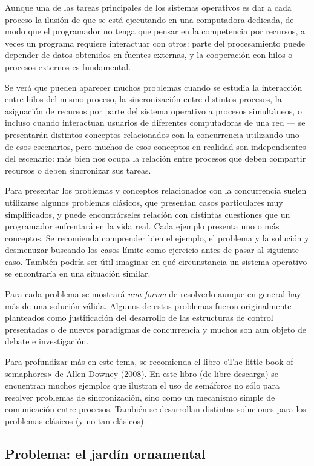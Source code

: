 \documentclass[11pt,fleqn]{book} %
\begin{document}
Aunque una de las tareas principales de los sistemas operativos es dar
a cada proceso la ilusión de que se está ejecutando en una computadora
dedicada, de modo que el programador no tenga que pensar en la
competencia por recursos, a veces un programa requiere interactuar con
otros: parte del procesamiento puede depender de datos
obtenidos en fuentes externas, y la cooperación con hilos o
procesos externos es fundamental.

Se verá que pueden aparecer muchos problemas cuando se estudia la
interacción entre hilos del mismo proceso, la sincronización entre
distintos procesos, la asignación de recursos por parte del sistema operativo a
procesos simultáneos, o incluso cuando interactuan usuarios de
diferentes computadoras de una red — se presentarán distintos conceptos
relacionados con la concurrencia utilizando uno de esos escenarios,
pero muchos de esos conceptos en realidad son independientes del
escenario: más bien nos ocupa la relación entre procesos que deben
compartir recursos o deben sincronizar sus tareas.

Para presentar los problemas y conceptos relacionados con la
concurrencia suelen utilizarse algunos problemas clásicos, que
presentan casos particulares muy simplificados, y puede encontrárseles
relación con distintas cuestiones que un programador enfrentará en
la vida real. Cada ejemplo presenta uno o más
conceptos. Se recomienda comprender bien el ejemplo, el problema y la
solución y desmenuzar buscando los casos límite como ejercicio antes de pasar al siguiente
caso. También podría ser útil imaginar en qué circunstancia un
sistema operativo se encontraría en una situación similar.

Para cada problema se mostrará \emph{una forma} de resolverlo 
aunque en general hay más de
una solución válida. Algunos de estos problemas fueron originalmente
planteados como justificación del desarrollo de las estructuras de
control presentadas o de nuevos paradigmas de concurrencia y muchos
son aun objeto de debate e investigación.

Para profundizar más en este tema, se recomienda el libro «\href{http://greenteapress.com/semaphores/}{The little book of semaphores}» de Allen Downey (2008).
En este libro (de libre descarga) se encuentran muchos ejemplos
que ilustran el uso de semáforos no sólo para resolver problemas de
sincronización, sino como un mecanismo simple de comunicación entre
procesos. También se desarrollan distintas soluciones para los
problemas clásicos (y no tan clásicos).
\subsection{Problema: el jardín ornamental}
\label{sec-3-3-2}
\label{PROC_problemas_clasicos}
\end{document}
